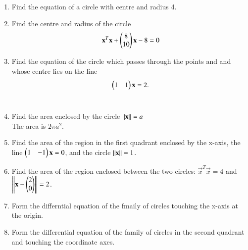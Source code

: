 \renewcommand{\theequation}{\theenumi}
\begin{enumerate}[label=\arabic*.,ref=\thesubsection.\theenumi]
\item Find the equation of a circle with centre  and radius 4.
\\
\solution 


\item Find the centre and radius of the circle
\begin{align}
\mathbf{x}^T\mathbf{x}+\begin{pmatrix}8\\10\end{pmatrix}\mathbf{x} -8= 0
\end{align}
%
\item Find the equation of the circle which passes through the points  and  and whose centre lies on the line 
\begin{align}
\label{eq:4.1.3_line}
\begin{pmatrix}1 & 1\end{pmatrix} \mathbf{x} = 2.
\end{align}
\\
\solution 

\item Find the area enclosed by the circle $\left\lVert\mathbf{x}\right\rVert = a$
%
\\
\solution The area is $2\pi a^2$.
%
\item Find the area of the region in the first quadrant enclosed by the x-axis, the line $\begin{pmatrix}1 & -1\end{pmatrix}\mathbf{x} = 0$, and the circle $\left\lVert\mathbf{x}\right\rVert = 1$.
%
\item Find the area of the region enclosed between the two circles: $\vec{x}^T\vec{x} = 4$ and $\left\lVert\mathbf{x}-\begin{pmatrix}2\\0\end{pmatrix}\right\rVert = 2$.
%
\item Form the differntial equation of the fmaily of circles touching the x-axis at the origin.
%
\item Form the differential equation of the family of circles in the second quadrant and touching the coordinate axes.
\end{enumerate}
